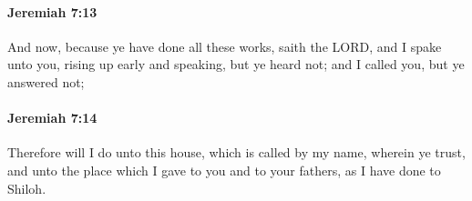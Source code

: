 		\paragraph{Jeremiah 7:13} %
			\label{JEREMIAH-7-13}

			And now, because ye have done all these works, saith the LORD, and I spake unto you, rising up early and speaking, but ye heard not; and I called you, but ye answered not;


		\paragraph{Jeremiah 7:14} %
			\label{JEREMIAH-7-14}

			Therefore will I do unto this house, which is called by my name, wherein ye trust, and unto the place which I gave to you and to your fathers, as I have done to Shiloh.


